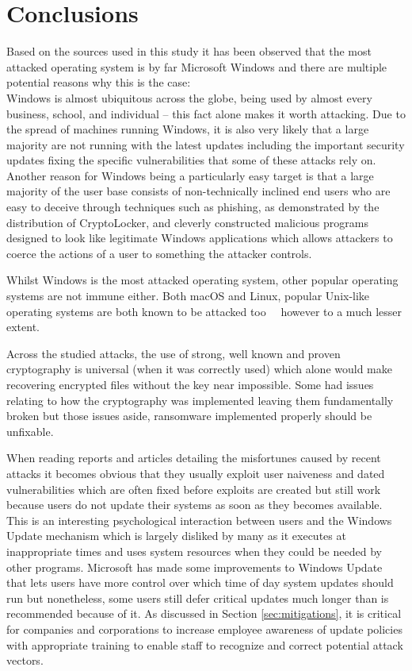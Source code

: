 \documentclass[10pt,a4paper]{article}
\begin{document}
\section{Conclusions}

Based on the sources used in this study it has been observed that the most attacked operating system is by far Microsoft Windows and there are multiple potential reasons why this is the case: \\
Windows is almost ubiquitous across the globe, being used by almost every business, school, and individual -- this fact alone makes it worth attacking. Due to the spread of machines running Windows, it is also very likely that a large majority are not running with the latest updates including the important security updates fixing the specific vulnerabilities that some of these attacks rely on.\\
Another reason for Windows being a particularly easy target is that a large majority of the user base consists of non-technically inclined end users who are easy to deceive through techniques such as phishing, as demonstrated by the distribution of CryptoLocker, and cleverly constructed malicious programs designed to look like legitimate Windows applications which allows attackers to coerce the actions of a user to something the attacker controls.

Whilst Windows is the most attacked operating system, other popular operating systems are not immune either. Both macOS and Linux, popular Unix-like operating systems are both known to be attacked too~\cite{linuxRansomware}~\cite{osxRansomware} however to a much lesser extent.

Across the studied attacks, the use of strong, well known and proven cryptography is universal (when it was correctly used) which alone would make recovering encrypted files without the key near impossible. Some had issues relating to how the cryptography was implemented leaving them fundamentally broken but those issues aside, ransomware implemented properly should be unfixable.

When reading reports and articles detailing the misfortunes caused by recent attacks it becomes obvious that they usually exploit user naiveness and dated vulnerabilities which are often fixed before exploits are created but still work because users do not update their systems as soon as they becomes available. This is an interesting psychological interaction between users and the Windows Update mechanism which is largely disliked by many as it executes at inappropriate times and uses system resources when they could be needed by other programs. Microsoft has made some improvements to Windows Update that lets users have more control over which time of day system updates should run but nonetheless, some users still defer critical updates much longer than is recommended because of it. As discussed in Section \ref{sec:mitigations}, it is critical for companies and corporations to increase employee awareness of update policies with appropriate training to enable staff to recognize and correct potential attack vectors.
\end{document}
